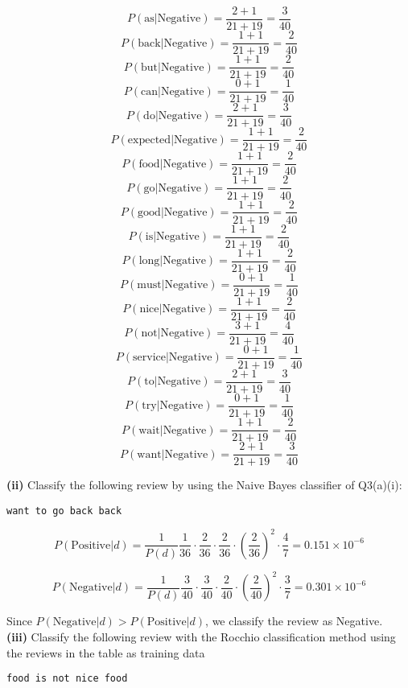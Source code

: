 \documentclass[11pt,a4paper]{report}
\begin{document}
\begin{multicols*}{2}
$$ P(\text{as} | \text{Negative} ) = \frac{2 + 1}{21 + 19} = \frac{3}{40}$$
$$ P(\text{back} | \text{Negative} ) = \frac{1 + 1}{21 + 19} = \frac{2}{40}$$
$$ P(\text{but} | \text{Negative} ) = \frac{1 + 1}{21 + 19} = \frac{2}{40}$$
$$ P(\text{can} | \text{Negative} ) = \frac{0 + 1}{21 + 19} = \frac{1}{40}$$
$$ P(\text{do} | \text{Negative} ) = \frac{2 + 1}{21 + 19} = \frac{3}{40}$$
$$ P(\text{expected} | \text{Negative} ) = \frac{1 + 1}{21 + 19} = \frac{2}{40}$$
$$ P(\text{food} | \text{Negative} ) = \frac{1 + 1}{21 + 19} = \frac{2}{40}$$
$$ P(\text{go} | \text{Negative} ) = \frac{1 + 1}{21 + 19} = \frac{2}{40}$$
$$ P(\text{good} | \text{Negative} ) = \frac{1 + 1}{21 + 19} = \frac{2}{40}$$
$$ P(\text{is} | \text{Negative} ) = \frac{1 + 1}{21 + 19} = \frac{2}{40}$$
$$ P(\text{long} | \text{Negative} ) = \frac{1 + 1}{21 + 19} = \frac{2}{40}$$
$$ P(\text{must} | \text{Negative} ) = \frac{0 + 1}{21 + 19} = \frac{1}{40}$$
$$ P(\text{nice} | \text{Negative} ) = \frac{1 + 1}{21 + 19} = \frac{2}{40}$$
$$ P(\text{not} | \text{Negative} ) = \frac{3 + 1}{21 + 19} = \frac{4}{40}$$
$$ P(\text{service} | \text{Negative} ) = \frac{0 + 1}{21 + 19} = \frac{1}{40}$$
$$ P(\text{to} | \text{Negative} ) = \frac{2 + 1}{21 + 19} = \frac{3}{40}$$
$$ P(\text{try} | \text{Negative} ) = \frac{0 + 1}{21 + 19} = \frac{1}{40}$$
$$ P(\text{wait} | \text{Negative} ) = \frac{1 + 1}{21 + 19} = \frac{2}{40}$$
$$ P(\text{want} | \text{Negative} ) = \frac{2 + 1}{21 + 19} = \frac{3}{40}$$

\noindent \textbf{(ii)} Classify the following review by using the Naive Bayes classifier of Q3(a)(i):
\begin{center}\verb|want to go back back|\end{center}

\scriptsize
$$P(\text{Positive}|d) = \frac{1}{P(d)} \frac{1}{36} \cdot \frac{2}{36} \cdot \frac{2}{36} \cdot (\frac{2}{36})^2 \cdot \frac{4}{7}= 0.151 \times 10^{-6}$$

$$P(\text{Negative}|d) = \frac{1}{P(d)} \frac{3}{40} \cdot \frac{3}{40} \cdot \frac{2}{40} \cdot (\frac{2}{40})^2  \cdot \frac{3}{7}= 0.301 \times 10^{-6}$$
\normalsize

\noindent Since $P(\text{Negative}|d) > P(\text{Positive}|d)$, we classify the review as Negative.\\

\noindent \textbf{(iii)} Classify the following review with the Rocchio classification method using the reviews in the table as training data
\begin{center}\verb|food is not nice food|\end{center}


\end{multicols*}
\end{document}
